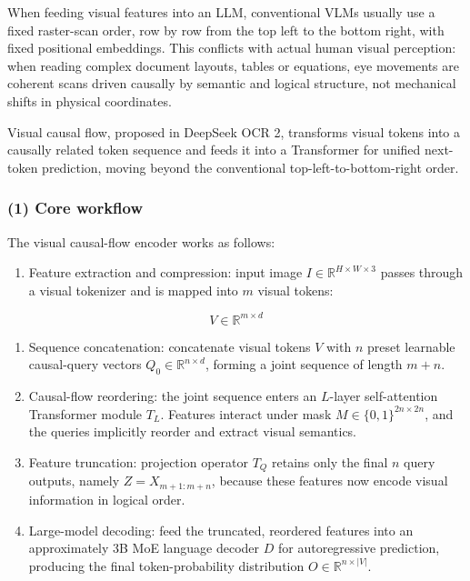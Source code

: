 When feeding visual features into an LLM, conventional VLMs usually use a fixed raster-scan order, row by row from the top left to the bottom right, with fixed positional embeddings. This conflicts with actual human visual perception: when reading complex document layouts, tables or equations, eye movements are coherent scans driven causally by semantic and logical structure, not mechanical shifts in physical coordinates.

Visual causal flow, proposed in DeepSeek OCR 2, transforms visual tokens into a causally related token sequence and feeds it into a Transformer for unified next-token prediction, moving beyond the conventional top-left-to-bottom-right order.

\hypertarget{core-workflow}{%
\subsubsection{(1) Core workflow}\label{core-workflow}}

The visual causal-flow encoder works as follows:

\begin{enumerate}
\def\labelenumi{\arabic{enumi}.}
\tightlist
\item
{}
  Feature extraction and compression: input image \(I\in\mathbb{R}^{H\times W\times 3}\) passes through a visual tokenizer and is mapped into \(m\) visual tokens:
\end{enumerate}

\[
V\in\mathbb{R}^{m\times d}
\]

\begin{enumerate}
\def\labelenumi{\arabic{enumi}.}
\setcounter{enumi}{1}
\tightlist
\item
  Sequence concatenation: concatenate visual tokens \(V\) with \(n\) preset learnable causal-query vectors \(Q_0\in\mathbb{R}^{n\times d}\), forming a joint sequence of length \(m+n\).
\item
  Causal-flow reordering: the joint sequence enters an \(L\)-layer self-attention Transformer module \(T_L\). Features interact under mask \(M\in\{0,1\}^{2n\times2n}\), and the queries implicitly reorder and extract visual semantics.
\item
  Feature truncation: projection operator \(T_Q\) retains only the final \(n\) query outputs, namely \(Z=X_{m+1:m+n}\), because these features now encode visual information in logical order.
\item
  Large-model decoding: feed the truncated, reordered features into an approximately 3B MoE language decoder \(D\) for autoregressive prediction, producing the final token-probability distribution \(O\in\mathbb{R}^{n\times |V|}\).
\end{enumerate}

